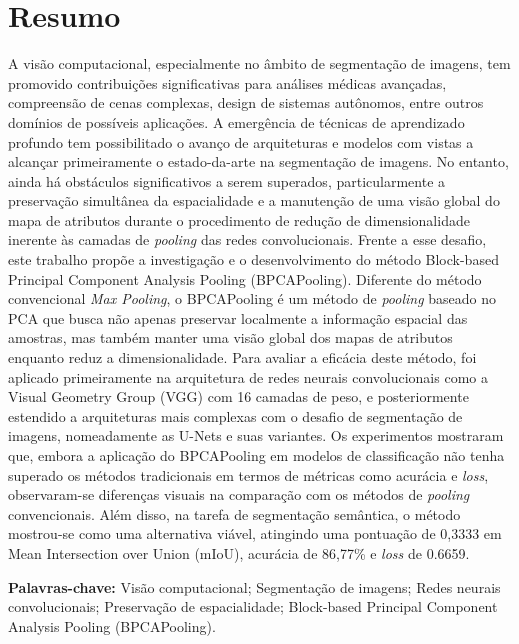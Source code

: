 \section*{Resumo}
\thispagestyle{empty}
\makeatletter
\makeatother
A visão computacional, especialmente no âmbito de segmentação de imagens, tem promovido contribuições significativas para análises médicas avançadas, compreensão de cenas complexas, design de sistemas autônomos, entre outros domínios de possíveis aplicações. A emergência de técnicas de aprendizado profundo tem possibilitado o avanço de arquiteturas e modelos com vistas a alcançar primeiramente o estado-da-arte na segmentação de imagens.
No entanto, ainda há obstáculos significativos a serem superados, particularmente a preservação simultânea da espacialidade e a manutenção de uma visão global do mapa de atributos durante o procedimento de redução de dimensionalidade inerente às camadas de \textit{pooling} das redes convolucionais.
Frente a esse desafio, este trabalho propõe a investigação e o desenvolvimento do método Block-based Principal Component Analysis Pooling (BPCAPooling). Diferente do método convencional \textit{Max Pooling}, o BPCAPooling é um método de \textit{pooling} baseado no PCA que busca não apenas preservar localmente a informação espacial das amostras, mas também manter uma visão global dos mapas de atributos enquanto reduz a dimensionalidade.
Para avaliar a eficácia deste método, foi aplicado primeiramente na arquitetura de redes neurais convolucionais como a Visual Geometry Group (VGG) com 16 camadas de peso, e posteriormente estendido a arquiteturas mais complexas com o desafio de segmentação de imagens, nomeadamente as U-Nets e suas variantes.
Os experimentos mostraram que, embora a aplicação do BPCAPooling em modelos de classificação não tenha superado os métodos tradicionais em termos de métricas como acurácia e \textit{loss}, observaram-se diferenças visuais na comparação com os métodos de \textit{pooling} convencionais. Além disso, na tarefa de segmentação semântica, o método mostrou-se como uma alternativa viável, atingindo uma pontuação de 0,3333 em Mean Intersection over Union (mIoU), acurácia de 86,77\% e \textit{loss} de 0.6659.

\textbf{Palavras-chave:} Visão computacional; Segmentação de imagens; Redes neurais convolucionais; Preservação de espacialidade; Block-based Principal Component Analysis Pooling (BPCAPooling).
